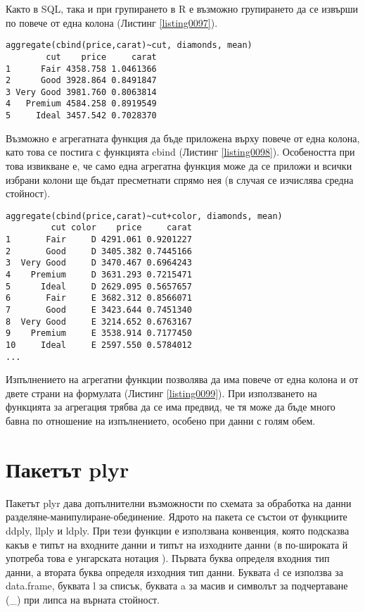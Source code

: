 Както в SQL, така и при групирането в R е възможно групирането да се извърши по повече от една колона (Листинг \ref{listing0097}).

\begin{lstlisting}[caption=Прилагане на агрегатна функция върху повече колони в едни и същи групи, label=listing0098]
aggregate(cbind(price,carat)~cut, diamonds, mean)
        cut    price     carat
1      Fair 4358.758 1.0461366
2      Good 3928.864 0.8491847
3 Very Good 3981.760 0.8063814
4   Premium 4584.258 0.8919549
5     Ideal 3457.542 0.7028370
\end{lstlisting}

Възможно е агрегатната функция да бъде приложена върху повече от една колона, като това се постига с функцията cbind (Листинг \ref{listing0098}). Особеността при това извикване е, че само една агрегатна функция може да се приложи и всички избрани колони ще бъдат пресметнати спрямо нея (в случая се изчислява средна стойност).

\begin{lstlisting}[caption=Използване на повече колони от двете страни на формулата, label=listing0099]
aggregate(cbind(price,carat)~cut+color, diamonds, mean)
         cut color    price     carat
1       Fair     D 4291.061 0.9201227
2       Good     D 3405.382 0.7445166
3  Very Good     D 3470.467 0.6964243
4    Premium     D 3631.293 0.7215471
5      Ideal     D 2629.095 0.5657657
6       Fair     E 3682.312 0.8566071
7       Good     E 3423.644 0.7451340
8  Very Good     E 3214.652 0.6763167
9    Premium     E 3538.914 0.7177450
10     Ideal     E 2597.550 0.5784012
...
\end{lstlisting}

Изпълнението на агрегатни функции позволява да има повече от една колона и от двете страни на формулата (Листинг \ref{listing0099}). При използването на функцията за агрегация трябва да се има предвид, че тя може да бъде много бавна по отношение на изпълнението, особено при данни с голям обем. 

\section{Пакетът plyr}

Пакетът plyr дава допълнителни възможности по схемата за обработка на данни разделяне-манипулиране-обединение. Ядрото на пакета се състои от функциите ddply, llply и ldply. При тези функции е използвана конвенция, която подсказва какъв е типът на входните данни и типът на изходните данни (в по-широката й употреба това е унгарската нотация \cite{hnot}). Първата буква определя входния тип данни, а втората буква определя изходния тип данни. Буквата d се използва за data.frame, буквата l за списък, буквата a за масив и символът за подчертаване (\_) при липса на върната стойност. 

